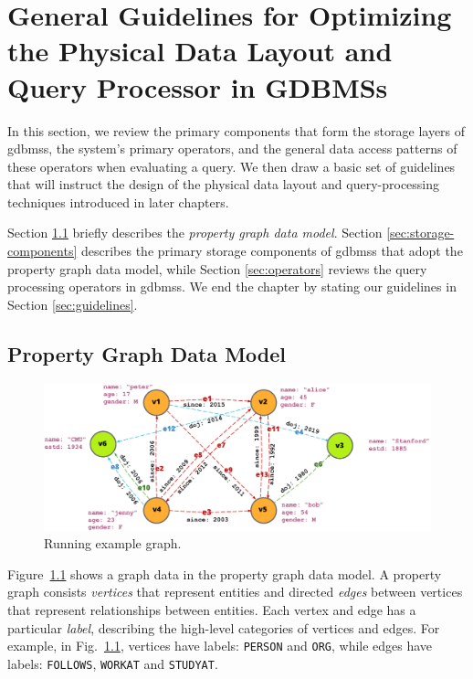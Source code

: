 \chapter{General Guidelines for Optimizing the Physical Data Layout and Query Processor in GDBMSs}
\label{c:guidelines}

In this section, we review the primary components that form the storage layers of \gls{gdbms}s, the system's primary operators, and the general data access patterns of these operators when evaluating a query. We then draw a basic set of guidelines that will instruct the design of the physical data layout and query-processing techniques introduced in later chapters.

Section \ref{sec:property-graph-data-model} briefly describes the \emph{property graph data model}. Section \ref{sec:storage-components} describes the primary storage components of \gls{gdbms}s that adopt the property graph data model, while Section \ref{sec:operators} reviews the query processing operators in \gls{gdbms}s. We end the chapter by stating our guidelines in Section \ref{sec:guidelines}.

\section{Property Graph Data Model}
\label{sec:property-graph-data-model}

\begin{figure}
	\includegraphics[scale=0.86]{img/property-graph}
	\vspace{-8pt}
	\caption{Running example graph.}
	\label{fig:runn}
	\vspace{-8pt}
\end{figure}

Figure~\ref{fig:runn} shows a graph data in the property graph data model. A property graph consists \emph{vertices} that represent entities and directed \emph{edges} between vertices that represent relationships between entities. Each vertex and edge has a particular \emph{label}, describing the high-level categories of vertices and edges. For example, in Fig.~\ref{fig:runn}, vertices have labels: \texttt{PERSON} and \texttt{ORG}, while edges have labels: \texttt{FOLLOWS}, \texttt{WORKAT} and \texttt{STUDYAT}.


